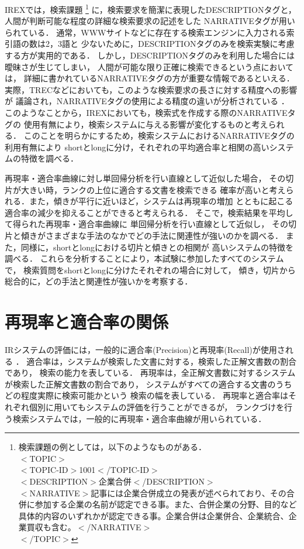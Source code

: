 IREXでは，検索課題
\footnote{検索課題の例としては，以下のようなものがある．\\
$<$TOPIC$>$\\
$<$TOPIC-ID$>$1001$<$/TOPIC-ID$>$\\
$<$DESCRIPTION$>$企業合併$<$/DESCRIPTION$>$\\
$<$NARRATIVE$>$記事には企業合併成立の発表が述べられており、その合併に参加する企業の名前が認定できる事。また、合併企業の分野、目的など具体的内容のいずれかが認定できる事。企業合併は企業併合、企業統合、企業買収も含む。$<$/NARRATIVE$>$\\
$<$/TOPIC$>$}
に，検索要求を簡潔に表現したDESCRIPTIONタグと，
人間が判断可能な程度の詳細な検索要求の記述をした
NARRATIVEタグが用いられている．
通常，WWWサイトなどに存在する検索エンジンに入力される索引語の数は2，3語と
少ないために，DESCRIPTIONタグのみを検索実験に考慮する方が実用的である．
しかし，DESCRIPTIONタグのみを利用した場合には曖昧さが生じてしまい，
人間が可能な限り正確に検索できるという点においては，
詳細に書かれているNARRATIVEタグの方が重要な情報であるといえる．
実際，TRECなどにおいても，このような検索要求の長さに対する精度への影響が
議論され，NARRATIVEタグの使用による精度の違いが分析されている
\cite{Voorhees97}\cite{Voorhees98}\cite{Hull96}．
このようなことから，IREXにおいても，検索式を作成する際のNARRATIVEタグの
使用有無により，検索システムに与える影響が変化するものと考えられる．
このことを明らかにするため，検索システムにおけるNARRATIVEタグの利用有無により
shortとlongに分け，それぞれの平均適合率と相関の高いシステムの特徴を調べる．

再現率・適合率曲線に対し単回帰分析を行い直線として近似した場合，
その切片が大きい時，ランクの上位に適合する文書を検索できる
確率が高いと考えられる．また，傾きが平行に近いほど，システムは再現率の増加
とともに起こる適合率の減少を抑えることができると考えられる．
そこで，検索結果を平均して得られた再現率・適合率曲線に
単回帰分析を行い直線として近似し，
その切片と傾きがさまざまな手法のなかでどの手法に関連性が強いのかを調べる．
また，同様に，shortとlongにおける切片と傾きとの相関が
高いシステムの特徴を調べる．
これらを分析することにより，本試験に参加したすべてのシステムで，
検索質問をshortとlongに分けたそれぞれの場合に対して，
傾き，切片から総合的に，どの手法と関連性が強いかを考察する．


\vspace*{-0.3cm}
\section{再現率と適合率の関係}
IRシステムの評価には，一般的に適合率(Precision)と再現率(Recall)が使用される
\cite{lewis2}\cite{Witten}．
適合率は，システムが検索した文書に対する，検索した正解文書数の割合であり，
検索の能力を表している．
再現率は，全正解文書数に対するシステムが検索した正解文書数の割合であり，
システムがすべての適合する文書のうちどの程度実際に検索可能かという
検索の幅を表している．
再現率と適合率はそれぞれ個別に用いてもシステムの評価を行うことができるが，
ランクづけを行う検索システムでは，一般的に再現率・適合率曲線が用いられている．

